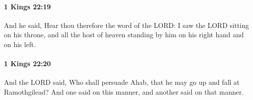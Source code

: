		\paragraph{1 Kings 22:19} %
			\label{1KINGS-22-19}

			And he said, Hear thou therefore the word of the LORD: I saw the LORD sitting on his throne, and all the host of heaven standing by him on his right hand and on his left.


		\paragraph{1 Kings 22:20} %
			\label{1KINGS-22-20}

			And the LORD said, Who shall persuade Ahab, that he may go up and fall at Ramothgilead? And one said on this manner, and another said on that manner.


